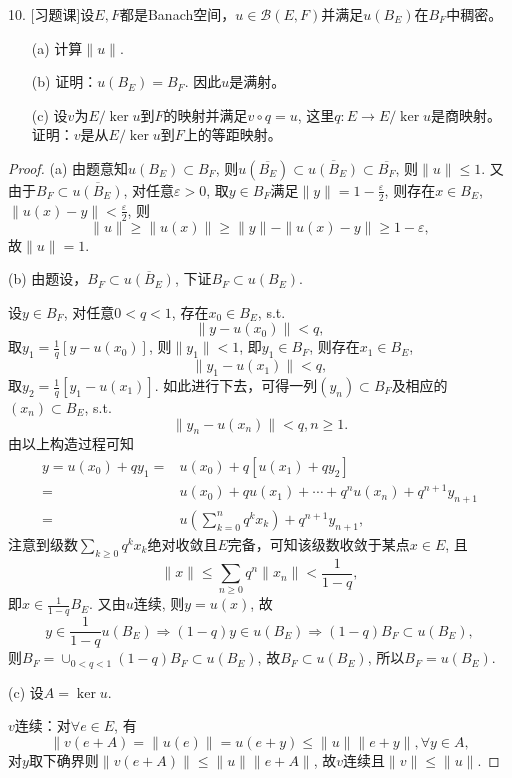 \documentclass[a4paper,8pt]{ctexart}\textwidth 140mm \textheight 216mm
\newcommand{\e}{\varepsilon}
\newcommand{\8}{\infty}
\begin{document}
10. [习题课]设$E,F$都是Banach空间，$u\in\mathcal{B}(E,F)$并满足$u(B_E)$在$B_F$中稠密。
\begin{enumerate}
	\item[(a)] 计算$\|u\|$.
	\item[(b)] 证明：$u(B_E)=B_F$. 因此$u$是满射。
	\item[(c)] 设$v$为$E/\ker u$到$F$的映射并满足$v\circ q=u$, 这里$q:E\to E/\ker u$是商映射。证明：$v$是从$E/\ker u$到$F$上的等距映射。
\end{enumerate}
\begin{proof}
	(a) 由题意知$u(B_E)\subset B_F$, 则$u(\overline{B_E})\subset \overline{u(B_E)}\subset \overline{B_F}$, 则$\|u\|\leq 1$. 又由于$B_F\subset \overline{u(B_E)}$, 对任意$\e>0$, 取$y\in B_F$满足$\|y\|=1-\frac{\e}{2}$, 则存在$x\in B_E$, $\|u(x)-y\|<\frac{\e}{2}$,
	则
	\begin{equation*}
	\|u\|\geq \|u(x)\|\geq \|y\|-\|u(x)-y\|\geq 1-\e,
	\end{equation*} 
	故$\|u\|=1$.
	
	(b) 由题设，$B_F\subset \overline{u(B_E)}$, 下证$B_F\subset u(B_E)$. 
	
	设$y\in B_F$, 对任意$0<q<1$, 存在$x_0\in B_E$, s.t. $$\|y-u(x_0)\|<q,$$ 
	取$y_1=\frac{1}{q}[y-u(x_0)]$, 则$\|y_1\|<1$, 即$y_1\in B_F$, 则存在$x_1\in  B_E$, $$\|y_1-u(x_1)\|<q,$$
	取$y_2=\frac{1}{q}[y_1-u(x_1)]$. 如此进行下去，可得一列$(y_n)\subset B_F$及相应的$(x_n)\subset B_E$, s.t.
	$$\|y_n-u(x_n)\|<q,n\geq 1.$$
	由以上构造过程可知
	\begin{equation*}
	\begin{split}
	y=u(x_0)+qy_1=&u(x_0)+q[u(x_1)+qy_2]\\
	=&u(x_0)+qu(x_1)+\cdots+q^nu(x_n)+q^{n+1}y_{n+1}\\
	=&u(\sum_{k=0}^n q^kx_k)+q^{n+1}y_{n+1},
	\end{split}
	\end{equation*}
	注意到级数$\sum_{k\geq0} q^kx_k$绝对收敛且$E$完备，可知该级数收敛于某点$x\in E$, 且
	$$\|x\|\leq \sum_{n\geq 0}q^n\|x_n\|<\frac{1}{1-q},$$
	即$x\in \frac{1}{1-q}B_E$. 又由$u$连续, 则$y=u(x)$, 故$$y\in \frac{1}{1-q}u(B_E)\Rightarrow (1-q)y\in u(B_E)\Rightarrow (1-q)B_F\subset u(B_E),$$ 
	则$B_F=\cup_{0<q<1}(1-q)B_F\subset u(B_E)$, 故$B_F\subset u(B_E)$, 所以$B_F=u(B_E)$.
	
	
	(c) 设$A=\ker u$.
	
	$v$连续：对$\forall e\in E$, 有
	\[\|v(e+A)=\|u(e)\|=u(e+y)\leq \|u\|\|e+y\|,\forall y\in A,\]
	对$y$取下确界则$\|v(e+A)\|\leq \|u\|\|e+A\|$, 故$v$连续且$\|v\|\leq\|u\|$.
	

\end{proof}
\end{document}
